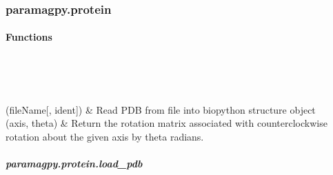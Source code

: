 \documentclass[a4paper,10pt,english,openany,oneside]{sphinxmanual}
\begin{document}
\subsubsection{paramagpy.protein}
\label{\detokenize{reference/protein:module-paramagpy.protein}}\label{\detokenize{reference/protein:paramagpy-protein}}\label{\detokenize{reference/protein:protein}}\label{\detokenize{reference/protein::doc}}

\paragraph{Functions}
\label{\detokenize{reference/protein:functions}}

\begin{savenotes}\sphinxatlongtablestart\begin{longtable}{}
\hline

\endfirsthead

%
{}\\
\hline

\endhead

\hline
{}\\
\endfoot

\endlastfoot

{\hyperref[\detokenize{reference/generated/paramagpy.protein.load_pdb:paramagpy.protein.load_pdb}]{}}(fileName{[}, ident{]})
&
Read PDB from file into biopython structure object
\\
\hline
{\hyperref[\detokenize{reference/generated/paramagpy.protein.rotation_matrix:paramagpy.protein.rotation_matrix}]{}}(axis, theta)
&
Return the rotation matrix associated with counterclockwise rotation about the given axis by theta radians.
\\
\hline
\end{longtable}\sphinxatlongtableend\end{savenotes}


\subparagraph{paramagpy.protein.load\_pdb}
\label{\detokenize{reference/generated/paramagpy.protein.load_pdb:paramagpy-protein-load-pdb}}\label{\detokenize{reference/generated/paramagpy.protein.load_pdb::doc}}
\end{document}
